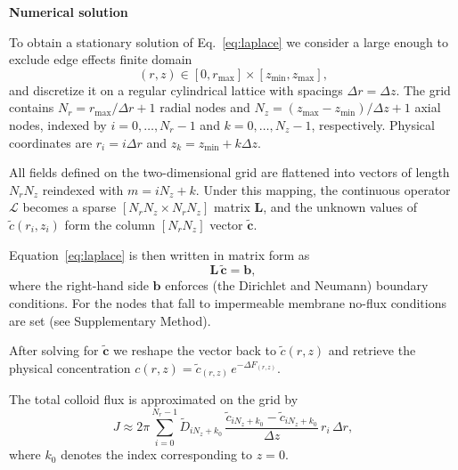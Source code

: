 \documentclass[12pt, a4paper]{article}
\begin{document}
\textbf{Numerical solution}

To obtain a stationary solution of Eq.~\eqref{eq:laplace} we consider a large enough to exclude edge effects finite domain
\begin{equation*}
  (r,z)\in[0,r_{\max}]\times[z_{\min},z_{\max}],
\end{equation*}
and discretize it on a regular cylindrical lattice with spacings $\Delta r=\Delta z$.
The grid contains $N_r=r_{\max}/\Delta r+1$ radial nodes and $N_z=(z_{\max}-z_{\min})/\Delta z+1$ axial nodes, indexed by $i=0,\dots,N_r-1$ and $k=0,\dots,N_z-1$, respectively. Physical coordinates are $r_i=i\Delta r$ and $z_k=z_{\min}+k\Delta z$.

All fields defined on the two-dimensional grid are flattened into vectors of length $N_rN_z$ reindexed with $m=iN_z+k$.
Under this mapping, the continuous operator $\mathcal L$ becomes a sparse $[N_rN_z\times N_rN_z]$ matrix $\mathbf L$, and the unknown values of $\tilde c(r_i, z_i)$ form the column $[N_rN_z]$ vector $\tilde{\bm c}$.

Equation~\eqref{eq:laplace} is then written in matrix form as
\begin{equation}
  \mathbf L\,\tilde{\bm c}=\bm b,
  \label{eq:matrix_form}
\end{equation}
where the right-hand side $\bm b$ enforces (the Dirichlet and Neumann) boundary conditions.
For the nodes that fall to impermeable membrane no-flux conditions are set (see Supplementary Method).

After solving for $\tilde{\bm c}$ we reshape the vector back to $\tilde{c}(r,z)$ and retrieve the physical concentration $c(r,z)=\tilde c_(r,z)\,e^{-\Delta F_(r,z)}$.

The total colloid flux is approximated on the grid by
\begin{equation}
  J\approx 2\pi\sum_{i=0}^{N_r-1}
      \tilde D_{i N_z + k_0}\,
      \frac{\tilde c_{i N_z + k_0}-\tilde c_{i N_z + k_0}}{\Delta z}\,
      r_i\,\Delta r,
\end{equation}
where $k_0$ denotes the index corresponding to $z=0$.
\end{document}
